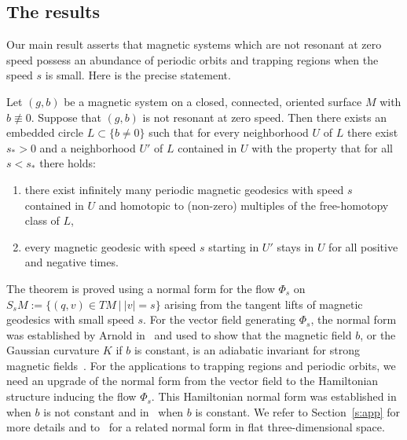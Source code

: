 \documentclass[AHL,Unicode,longabstracts,published]{cedram}
\begin{document}
\subsection{The results}\label{ss:main}
Our main result asserts that magnetic systems which are not resonant at zero speed possess an abundance of periodic orbits and trapping regions when the speed $s$ is small. Here is the precise statement.

\begin{theo}\label{t:main}
Let $(g,b)$ be a magnetic system on a closed, connected, oriented surface $M$ with $b\not\equiv0$. Suppose that $(g,b)$ is not resonant at zero speed. Then there exists an embedded circle $L\subset \{b\neq 0\}$ such that for every neighborhood $U$ of $L$ there exist $s_*>0$ and a neighborhood $U'$ of $L$ contained in $U$ with the property that for all $s<s_*$ there holds:
\begin{enumerate}
\item\label{theo1.4.1} there exist infinitely many periodic magnetic geodesics with speed $s$ contained in $U$ and homotopic to (non-zero) multiples of the free-homotopy class of $L$,
\item\label{theo1.4.2} every magnetic geodesic with speed $s$ starting in $U'$ stays in $U$ for all positive and negative times.
\end{enumerate}
\end{theo}

The theorem is proved using a normal form for the flow $\Phi_s$ on $S_sM:=\{(q,v)\in TM\ |\ |v|=s\}$ arising from the tangent lifts of magnetic geodesics with small speed $s$. For the vector field generating $\Phi_s$, the normal form was established by Arnold in~\cite{Arn97} and used to show that the magnetic field $b$, or the Gaussian curvature $K$ if $b$ is constant, is an adiabatic invariant for strong magnetic fields~\cite[Example~6.29]{AKN}. For the applications to trapping regions and periodic orbits, we need an upgrade of the normal form from the vector field to the Hamiltonian structure inducing the flow $\Phi_s$. This Hamiltonian normal form was established in~\cite{Castilho:2001} when $b$ is not constant and in~\cite{AB21} when $b$ is constant. We refer to Section~\ref{s:app} for more details and to~\cite{BS94} for a related normal form in flat three-dimensional space.
\end{document}
